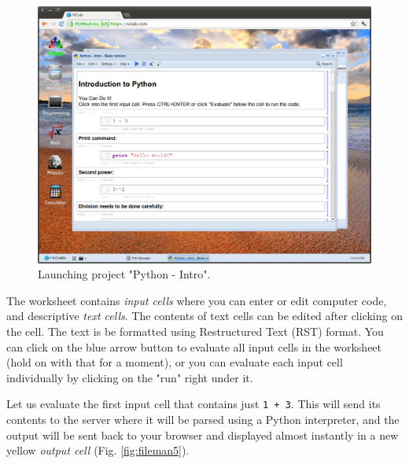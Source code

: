 \documentclass{article}
\begin{document}
\newpage

\begin{figure}[!ht]
\begin{center}
\includegraphics[width=\textwidth]{img/fileman4.png}
\end{center}
\caption{Launching project "Python - Intro".}
\label{fig:fileman4}
\end{figure}
\noindent
The worksheet contains {\em input cells} where you can enter or edit computer
code, and descriptive {\em text cells}. The contents of text cells can be 
edited after clicking on the cell. The text is be formatted using Restructured
Text (RST) format. You can click on the blue arrow button to evaluate all input 
cells in the worksheet (hold on with that for a moment), or you can evaluate 
each input cell individually by clicking on the "run" right under it. 

Let us evaluate the first input cell that contains just {\tt 1 + 3}. This will send its contents 
to the server where it will be parsed using a Python interpreter, and the 
output will be sent back to your browser and displayed almost instantly in
a new yellow {\em output cell} (Fig. \ref{fig:fileman5}).

\newpage
\end{document}
